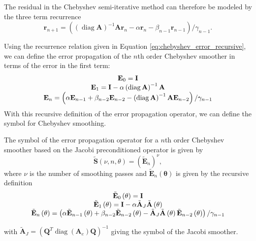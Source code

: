 \documentclass[review]{siamart190516}
\DeclareMathOperator{\diag}{diag}
\begin{document}
The residual in the Chebyshev semi-iterative method can therefore be modeled by the three term recurrence
\begin{equation}
\mathbf{r}_{n + 1} = \left( \left( \diag {\mathbf{A}} \right)^{-1} {\mathbf{A}} \mathbf{r}_n - \alpha \mathbf{r}_n - \beta_{n - 1} \mathbf{r}_{n - 1} \right) / \gamma_{n - 1}.
\label{eq:chebyshev_error_recursive}
\end{equation}

Using the recurrence relation given in Equation \ref{eq:chebyshev_error_recursive}, we can define the error propagation of the $n$th order Chebyshev smoother in terms of the error in the first term:
\begin{equation}
\begin{tabular}{c}
$\mathbf{E}_0 = \mathbf{I}$\\
$\mathbf{E}_1 = \mathbf{I} - \alpha \left( \diag {\mathbf{A}} \right)^{-1} {\mathbf{A}}$\\
$\mathbf{E}_n = \left( \alpha \mathbf{E}_{n - 1} + \beta_{n - 2} \mathbf{E}_{n - 2} - \left( \diag {\mathbf{A}} \right)^{-1} {\mathbf{A}} \mathbf{E}_{n - 2} \right) / \gamma_{n - 1}$
\end{tabular}
\label{eq:chebyshev_error_propagation}
\end{equation}
With this recursive definition of the error propagation operator, we can define the symbol for Chebyshev smoothing.

\begin{definition}
The symbol of the error propagation operator for a $n$th order Chebyshev smoother based on the Jacobi preconditioned operator is given by
\begin{equation}
\tilde{\mathbf{S}} \left( \nu, n, \theta \right) = \left( \tilde{\mathbf{E}}_n \right)^\nu,
\end{equation}
where $\nu$ is the number of smoothing passes and $\tilde{\mathbf{E}}_n \left( \mathbf{\theta} \right)$ is given by the recursive definition
\begin{equation}
\begin{tabular}{c}
$\tilde{\mathbf{E}}_0 \left( \mathbf{\theta} \right) = \mathbf{I}$\\
$\tilde{\mathbf{E}}_1 \left( \mathbf{\theta} \right) = \mathbf{I} - \alpha \tilde{\mathbf{A}}_J \tilde{\mathbf{A}} \left( \mathbf{\theta} \right)$\\
$\tilde{\mathbf{E}}_n \left( \mathbf{\theta} \right) = \left( \alpha \tilde{\mathbf{E}}_{n - 1} \left( \mathbf{\theta} \right) + \beta_{n - 2} \tilde{\mathbf{E}}_{n - 2} \left( \mathbf{\theta} \right) - \tilde{\mathbf{A}}_J \tilde{\mathbf{A}} \left( \mathbf{\theta} \right) \tilde{\mathbf{E}}_{n - 2} \left( \mathbf{\theta} \right) \right) / \gamma_{n - 1}$
\end{tabular}
\end{equation}
\label{def:chebyshev_symbol}
\end{definition}
with $\tilde{\mathbf{A}}_J = \left( \mathbf{Q}^T \diag \left( \mathbf{A}_e \right) \mathbf{Q} \right)^{-1}$ giving the symbol of the Jacobi smoother.
\end{document}
